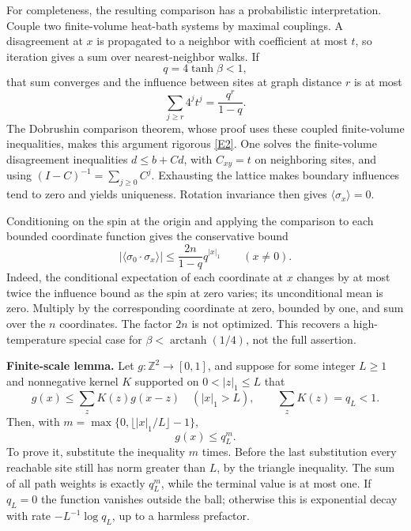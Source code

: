 \documentclass[11pt,a4paper]{article}
\newcommand{\Z}{\mathbb{Z}}
\newcommand{\eref}[2]{\hyperlink{extra:#1:#2}{[E#2]}}
\numberwithin{equation}{section}
\begin{document}
For completeness, the resulting comparison has a probabilistic interpretation. Couple two finite-volume heat-bath systems by maximal couplings. A disagreement at $x$ is propagated to a neighbor with coefficient at most $t$, so iteration gives a sum over nearest-neighbor walks. If
\begin{equation}\label{eq187:smallbeta}
 q=4\tanh\beta<1,
\end{equation}
that sum converges and the influence between sites at graph distance $r$ is at most
\[
 \sum_{j\ge r}4^jt^j=\frac{q^r}{1-q}.
\]
The Dobrushin comparison theorem, whose proof uses these coupled finite-volume inequalities, makes this argument rigorous \eref{187}{2}. One solves the finite-volume disagreement inequalities $d\le b+Cd$, with $C_{xy}=t$ on neighboring sites, and using $(I-C)^{-1}=\sum_{j\ge0}C^j$. Exhausting the lattice makes boundary influences tend to zero and yields uniqueness. Rotation invariance then gives $\langle\sigma_x\rangle=0$.

Conditioning on the spin at the origin and applying the comparison to each bounded coordinate function gives the conservative bound
\begin{equation}\label{eq187:highT}
 |\langle\sigma_0\cdot\sigma_x\rangle|
 \le \frac{2n}{1-q}q^{|x|_1}\qquad(x\ne0).
\end{equation}
Indeed, the conditional expectation of each coordinate at $x$ changes by at most twice the influence bound as the spin at zero varies; its unconditional mean is zero. Multiply by the corresponding coordinate at zero, bounded by one, and sum over the $n$ coordinates. The factor $2n$ is not optimized. This recovers a high-temperature special case for $\beta<\operatorname{arctanh}(1/4)$, not the full assertion.

\textbf{Finite-scale lemma.} Let $g:\Z^2\to[0,1]$, and suppose for some integer $L\ge1$ and nonnegative kernel $K$ supported on $0<|z|_1\le L$ that
\begin{equation}\label{eq187:block}
 g(x)\le\sum_zK(z)g(x-z)\quad(|x|_1>L),\qquad
 \sum_zK(z)=q_L<1.
\end{equation}
Then, with $m=\max\{0,\lfloor |x|_1/L\rfloor-1\}$,
\[
 g(x)\le q_L^m.
\]
To prove it, substitute the inequality $m$ times. Before the last substitution every reachable site still has norm greater than $L$, by the triangle inequality. The sum of all path weights is exactly $q_L^m$, while the terminal value is at most one. If $q_L=0$ the function vanishes outside the ball; otherwise this is exponential decay with rate $-L^{-1}\log q_L$, up to a harmless prefactor.
\end{document}
